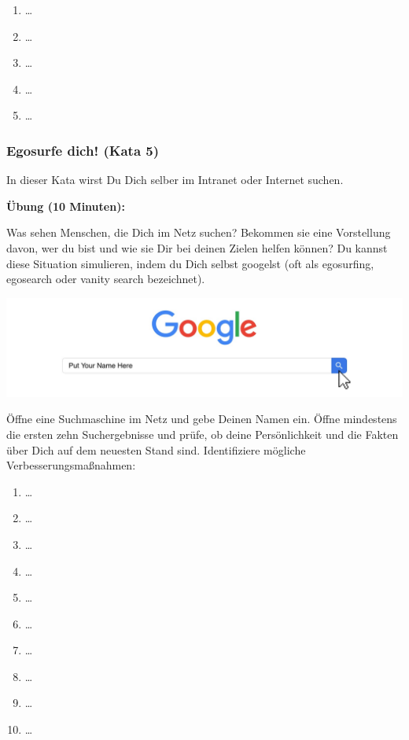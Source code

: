 \documentclass[
  ngerman,
  paper=a4,
,captions=tableheading
]{scrartcl}
\providecommand{\tightlist}{%
  \setlength{\itemsep}{0pt}\setlength{\parskip}{0pt}}
\begin{document}
\begin{enumerate}
\def\labelenumi{\arabic{enumi}.}
\tightlist
\item
  \ldots{}
\item
  \ldots{}
\item
  \ldots{}
\item
  \ldots{}
\item
  \ldots{}
\end{enumerate}

\hypertarget{egosurfe-dich-kata-5}{%
\subsubsection{Egosurfe dich! (Kata 5)}\label{egosurfe-dich-kata-5}}

In dieser Kata wirst Du Dich selber im Intranet oder Internet suchen.

\textbf{Übung (10 Minuten):}

Was sehen Menschen, die Dich im Netz suchen? Bekommen sie eine
Vorstellung davon, wer du bist und wie sie Dir bei deinen Zielen helfen
können? Du kannst diese Situation simulieren, indem du Dich selbst
googelst (oft als egosurfing, egosearch oder vanity search bezeichnet).

\includegraphics{./tex2pdf.-af94b87e0fdb9aa6/da4901626a83ec7029c76ad718e7f83d3f629d0f.png}

Öffne eine Suchmaschine im Netz und gebe Deinen Namen ein. Öffne
mindestens die ersten zehn Suchergebnisse und prüfe, ob deine
Persönlichkeit und die Fakten über Dich auf dem neuesten Stand sind.
Identifiziere mögliche Verbesserungsmaßnahmen:

\begin{enumerate}
\def\labelenumi{\arabic{enumi}.}
\tightlist
\item
  \ldots{}
\item
  \ldots{}
\item
  \ldots{}
\item
  \ldots{}
\item
  \ldots{}
\item
  \ldots{}
\item
  \ldots{}
\item
  \ldots{}
\item
  \ldots{}
\item
  \ldots{}
\end{enumerate}
\end{document}
